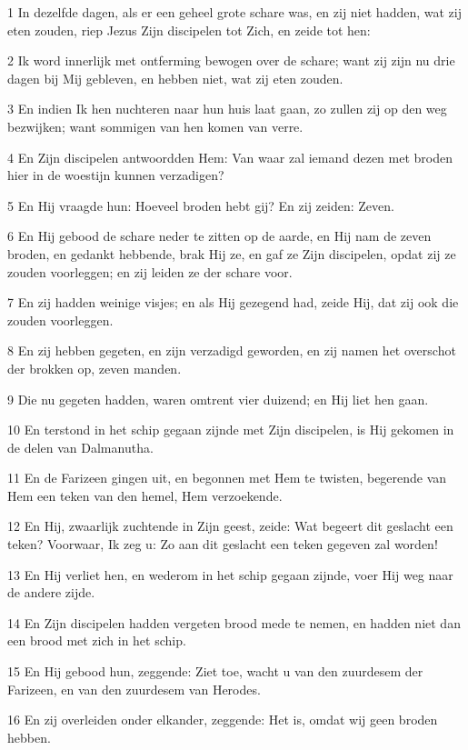 \par 1 In dezelfde dagen, als er een geheel grote schare was, en zij niet hadden, wat zij eten zouden, riep Jezus Zijn discipelen tot Zich, en zeide tot hen:
\par 2 Ik word innerlijk met ontferming bewogen over de schare; want zij zijn nu drie dagen bij Mij gebleven, en hebben niet, wat zij eten zouden.
\par 3 En indien Ik hen nuchteren naar hun huis laat gaan, zo zullen zij op den weg bezwijken; want sommigen van hen komen van verre.
\par 4 En Zijn discipelen antwoordden Hem: Van waar zal iemand dezen met broden hier in de woestijn kunnen verzadigen?
\par 5 En Hij vraagde hun: Hoeveel broden hebt gij? En zij zeiden: Zeven.
\par 6 En Hij gebood de schare neder te zitten op de aarde, en Hij nam de zeven broden, en gedankt hebbende, brak Hij ze, en gaf ze Zijn discipelen, opdat zij ze zouden voorleggen; en zij leiden ze der schare voor.
\par 7 En zij hadden weinige visjes; en als Hij gezegend had, zeide Hij, dat zij ook die zouden voorleggen.
\par 8 En zij hebben gegeten, en zijn verzadigd geworden, en zij namen het overschot der brokken op, zeven manden.
\par 9 Die nu gegeten hadden, waren omtrent vier duizend; en Hij liet hen gaan.
\par 10 En terstond in het schip gegaan zijnde met Zijn discipelen, is Hij gekomen in de delen van Dalmanutha.
\par 11 En de Farizeen gingen uit, en begonnen met Hem te twisten, begerende van Hem een teken van den hemel, Hem verzoekende.
\par 12 En Hij, zwaarlijk zuchtende in Zijn geest, zeide: Wat begeert dit geslacht een teken? Voorwaar, Ik zeg u: Zo aan dit geslacht een teken gegeven zal worden!
\par 13 En Hij verliet hen, en wederom in het schip gegaan zijnde, voer Hij weg naar de andere zijde.
\par 14 En Zijn discipelen hadden vergeten brood mede te nemen, en hadden niet dan een brood met zich in het schip.
\par 15 En Hij gebood hun, zeggende: Ziet toe, wacht u van den zuurdesem der Farizeen, en van den zuurdesem van Herodes.
\par 16 En zij overleiden onder elkander, zeggende: Het is, omdat wij geen broden hebben.
